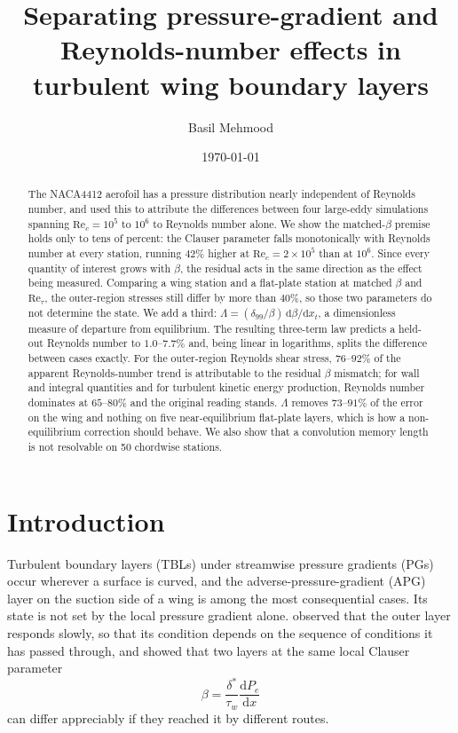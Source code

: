 \documentclass[11pt,a4paper]{article}
\title{\bfseries Separating pressure-gradient and Reynolds-number effects
in turbulent wing boundary layers}
\author[1]{Basil Mehmood}
\affil[1]{Independent Researcher. Correspondence: \href{mailto:basilmehmood117@gmail.com}{\texttt{basilmehmood117@gmail.com}}}
\date{\today}
\newcommand{\Rec}{\mathrm{Re}_c}
\newcommand{\Ret}{\mathrm{Re}_\tau}
\newcommand{\dnn}{\delta_{99}}
\begin{document}
\maketitle

\begin{abstract}
\noindent
The NACA4412 aerofoil has a pressure distribution nearly independent of
Reynolds number, and \citet{vinuesa2018} used this to attribute the
differences between four large-eddy simulations spanning $\Rec = 10^5$ to
$10^6$ to Reynolds number alone. We show the matched-$\beta$ premise holds
only to tens of percent: the Clauser parameter falls monotonically with
Reynolds number at every station, running $42\%$ higher at
$\Rec = 2\times10^5$ than at $10^6$. Since every quantity of interest grows
with $\beta$, the residual acts in the same direction as the effect being
measured. Comparing a wing station and a flat-plate station at matched
$\beta$ and $\Ret$, the outer-region stresses still differ by more than
$40\%$, so those two parameters do not determine the state. We add a third:
$\Lambda = (\dnn/\beta)\,\mathrm{d}\beta/\mathrm{d}x_t$, a dimensionless
measure of departure from equilibrium. The resulting three-term law predicts
a held-out Reynolds number to $1.0$--$7.7\%$ and, being linear in
logarithms, splits the difference between cases exactly. For the
outer-region Reynolds shear stress, $76$--$92\%$ of the apparent
Reynolds-number trend is attributable to the residual $\beta$ mismatch; for
wall and integral quantities and for turbulent kinetic energy production,
Reynolds number dominates at $65$--$80\%$ and the original reading stands.
$\Lambda$ removes $73$--$91\%$ of the error on the wing and nothing on five
near-equilibrium flat-plate layers, which is how a non-equilibrium
correction should behave. We also show that a convolution memory length is
not resolvable on 50 chordwise stations.
\end{abstract}

\section{Introduction}

Turbulent boundary layers (TBLs) under streamwise pressure gradients (PGs)
occur wherever a surface is curved, and the adverse-pressure-gradient (APG)
layer on the suction side of a wing is among the most consequential cases.
Its state is not set by the local pressure gradient alone. \citet{clauser1956}
observed that the outer layer responds slowly, so that its condition depends
on the sequence of conditions it has passed through, and \citet{bobke2017}
showed that two layers at the same local Clauser parameter
\begin{equation}
  \beta = \frac{\delta^*}{\tau_w}\frac{\mathrm{d}P_e}{\mathrm{d}x}
  \label{eq:beta}
\end{equation}
can differ appreciably if they reached it by different routes.
\end{document}
